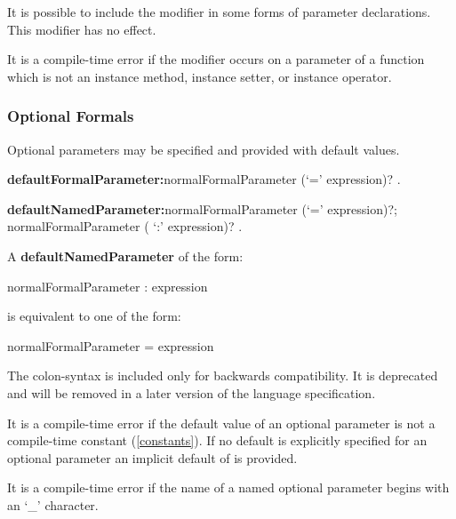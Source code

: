 \documentclass{article}
\begin{document}
\LMHash{}
It is possible to include the modifier \COVARIANT{} in some forms of parameter declarations.
This modifier has no effect.


\LMHash{}
It is a compile-time error if the modifier \COVARIANT{} occurs on a parameter of a function which is not an instance method, instance setter, or instance operator.


\subsubsection{Optional Formals}

\LMHash{}
Optional parameters may be specified and provided with default values.

\begin{grammar}
{\bf defaultFormalParameter:}normalFormalParameter (`=' expression)?
  .

{\bf defaultNamedParameter:}normalFormalParameter (`=' expression)?;
  normalFormalParameter ( `{\escapegrammar :}' expression)?
  .
\end{grammar}

A {\bf defaultNamedParameter} of the form:
\begin{code}
   normalFormalParameter : expression
\end{code}
is equivalent to one of the form:
\begin{code}
   normalFormalParameter = expression
\end{code}
The colon-syntax is included only for backwards compatibility.
It is deprecated and will be removed in a later version of the language specification.

\LMHash{}
It is a compile-time error if the default value of an optional parameter is not a compile-time constant (\ref{constants}).
If no default is explicitly specified for an optional parameter an implicit default of \NULL{} is provided.

\LMHash{}
It is a compile-time error if the name of a named optional parameter begins with an `\_' character.

\end{document}
